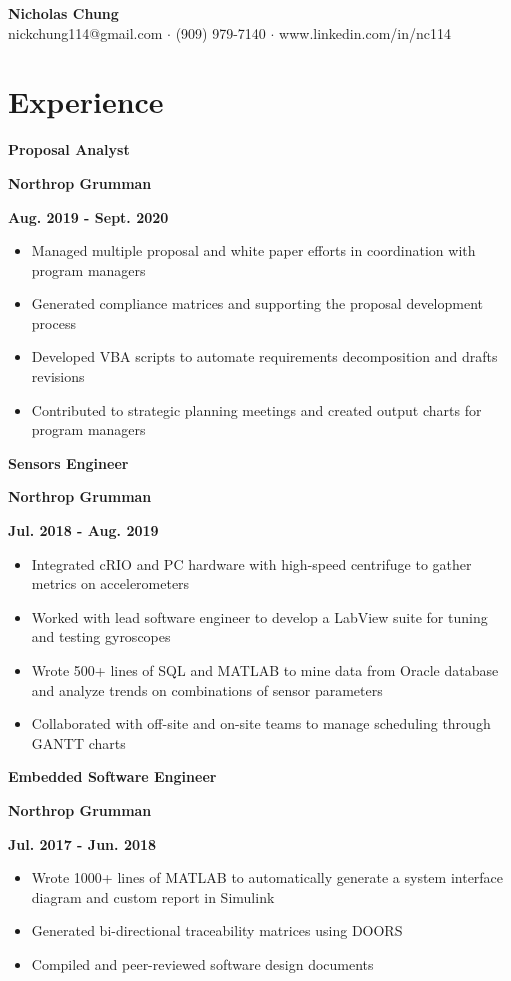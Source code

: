 \documentclass[12pt]{article}
\newcommand\textbox[1]{\parbox{.333\textwidth}{#1}}
\newcommand{\textlcr}[3]{\textbox{\textbf{#1}\hfill}\textbox{\hfil \textbf{#2}\hfil}\textbox{\hfill \textbf{#3}}}
\begin{document}
\begin{center}
	\textbf{\LARGE Nicholas Chung} \\ \vspace{.5ex}
	nickchung114@gmail.com $\cdot$ (909) 979-7140 $\cdot$ www.linkedin.com/in/nc114
\end{center}

\vspace{-8pt}
\smallskip

\section*{Experience}
\vspace*{-1em}\makebox[\linewidth]{\rule{\textwidth}{0.4pt}}

\textlcr{Proposal Analyst}{Northrop Grumman}{Aug. 2019 - Sept. 2020}
\begin{itemize}
\item Managed multiple proposal and white paper efforts in coordination with program managers
\item Generated compliance matrices and supporting the proposal development process
\item Developed VBA scripts to automate requirements decomposition and drafts revisions
\item Contributed to strategic planning meetings and created output charts for program managers

\end{itemize}

\textlcr{Sensors Engineer}{Northrop Grumman}{Jul. 2018 - Aug. 2019}
\begin{itemize}
\item Integrated cRIO and PC hardware with high-speed centrifuge to gather metrics on accelerometers
\item Worked with lead software engineer to develop a LabView suite for tuning and testing gyroscopes
\item Wrote 500+ lines of SQL and MATLAB to mine data from Oracle database and analyze trends on combinations of sensor parameters
\item Collaborated with off-site and on-site teams to manage scheduling through GANTT charts
\end{itemize}

\bigskip
\textlcr{Embedded Software Engineer}{Northrop Grumman}{Jul. 2017 - Jun. 2018}
\begin{itemize}
\item Wrote 1000+ lines of MATLAB to automatically generate a system interface diagram and custom report in Simulink
\item Generated bi-directional traceability matrices using DOORS
\item Compiled and peer-reviewed software design documents
\end{itemize}
\end{document}
